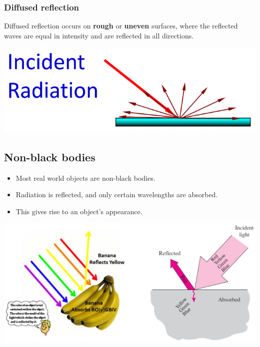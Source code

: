 \documentclass[11pt]{article}
\begin{document}
\subsubsection{Diffused reflection}
\label{sec:orgad4280a}
Diffused reflection occurs on \textbf{rough} or \textbf{uneven} surfaces, where the reflected waves are equal in intensity and are reflected in all directions.
\begin{center}
\includegraphics[width=.9\linewidth]{./images/diffused-reflection-diagram.png}
\end{center}

\subsection{Non-black bodies}
\label{sec:org4a67010}
\begin{itemize}
\item Most real world objects are non-black bodies.
\item Radiation is reflected, and only certain wavelengths are absorbed.
\item This gives rise to an object's appearance.
\end{itemize}

\begin{center}
\includegraphics[width=.9\linewidth]{./images/non-black-bodies-diagram.png}
\end{center}
\end{document}
